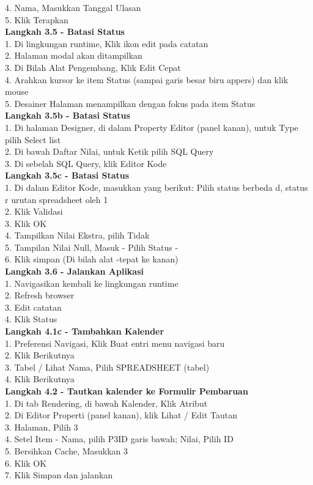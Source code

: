 \documentclass[12pt, times new roman, a4paper]{article}
\begin{document}
4. Nama, Masukkan Tanggal Ulasan \\
5. Klik Terapkan \\
\textbf{Langkah 3.5 - Batasi Status} \\
1. Di lingkungan runtime, Klik ikon edit pada catatan \\
2. Halaman modal akan ditampilkan \\
3. Di Bilah Alat Pengembang, Klik Edit Cepat \\
4. Arahkan kursor ke item Status (sampai garis besar biru appers) dan klik mouse \\
5. Desainer Halaman menampilkan dengan fokus pada item Status \\
\textbf{Langkah 3.5b - Batasi Status} \\
1. Di halaman Designer, di dalam Property Editor (panel kanan), untuk Type pilih Select list \\
2. Di bawah Daftar Nilai, untuk Ketik pilih SQL Query \\
3. Di sebelah SQL Query, klik Editor Kode \\
\textbf{Langkah 3.5c - Batasi Status} \\
1. Di dalam Editor Kode, masukkan yang berikut: Pilih status berbeda d, status r urutan spreadsheet oleh 1 \\
2. Klik Validasi \\
3. Klik OK \\
4. Tampilkan Nilai Ekstra, pilih Tidak \\
5. Tampilan Nilai Null, Masuk - Pilih Status - \\
6. Klik simpan (Di bilah alat -tepat ke kanan) \\
\textbf{Langkah 3.6 - Jalankan Aplikasi} \\
1. Navigasikan kembali ke lingkungan runtime \\
2. Refresh browser \\
3. Edit catatan \\
4. Klik Status \\
\textbf{Langkah 4.1c - Tambahkan Kalender} \\
1. Preferensi Navigasi, Klik Buat entri menu navigasi baru \\
2. Klik Berikutnya \\
3. Tabel / Lihat Nama, Pilih SPREADSHEET (tabel) \\
4. Klik Berikutnya \\
\textbf{Langkah 4.2 - Tautkan kalender ke Formulir Pembaruan} \\
1. Di tab Rendering, di bawah Kalender, Klik Atribut \\
2. Di Editor Properti (panel kanan), klik Lihat / Edit Tautan \\
3. Halaman, Pilih 3 \\
4. Setel Item - Nama, pilih P3\textunderscore ID garis bawah; Nilai, Pilih ID \\
5. Bersihkan Cache, Masukkan 3 \\
6. Klik OK \\
7. Klik Simpan dan jalankan \\
\end{document}
